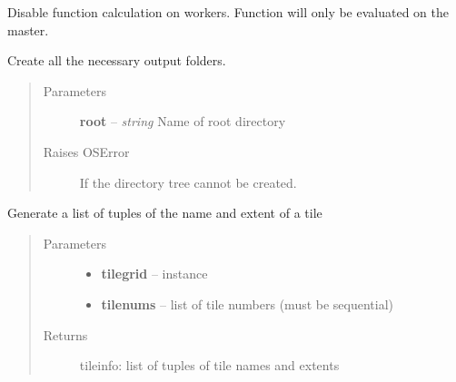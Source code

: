 \documentclass[letterpaper,10pt,english]{sphinxmanual}
\begin{document}

\begin{fulllineitems}
\label{docs/all_multipliers:all_multipliers.disable_on_workers}
Disable function calculation on workers. Function will
only be evaluated on the master.

\end{fulllineitems}



\begin{fulllineitems}
\label{docs/all_multipliers:all_multipliers.do_output_directory_creation}
Create all the necessary output folders.
\begin{quote}\begin{description}
\item[{Parameters}] \leavevmode
\textbf{root} -- \emph{string} Name of root directory

\item[{Raises OSError}] \leavevmode
If the directory tree cannot be created.

\end{description}\end{quote}

\end{fulllineitems}



\begin{fulllineitems}
\label{docs/all_multipliers:all_multipliers.get_tileinfo}
Generate a list of tuples of the name and extent of a tile
\begin{quote}\begin{description}
\item[{Parameters}] \leavevmode\begin{itemize}
\item {} 
\textbf{tilegrid} -- {\hyperref[docs/all_multipliers:all_multipliers.TileGrid]{}} instance

\item {} 
\textbf{tilenums} -- list of tile numbers (must be sequential)

\end{itemize}

\item[{Returns}] \leavevmode
tileinfo: list of tuples of tile names and extents

\end{description}\end{quote}

\end{fulllineitems}
\end{document}
